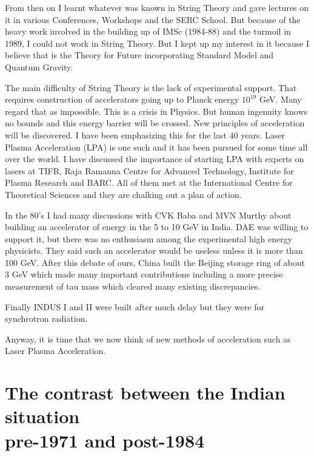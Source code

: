 From then on I learnt whatever was known in String Theory and gave 
lectures on it in various Conferences, Workshops and the SERC School. 
But because of the heavy work involved in the building up of IMSc 
(1984-88) and the turmoil in 1989, I could not work in String Theory. 
But I kept up my interest in it because I believe that is the Theory for 
Future incorporating Standard Model and Quantum Gravity.

The main difficulty of String Theory is the lack of experimental 
support. That requires construction of accelerators going up to Planck 
energy $10^{19}$ GeV. Many regard that as impo\-ssible. This is a crisis in 
Physics. But human ingenuity knows no bounds and this energy barrier 
will be crossed. New principles of acceleration will be discovered. I 
have been emphasizing this for the last 40 years. Laser Plasma 
Acceleration (LPA) is one such and it has been pursued for some time all 
over the world. I have discussed the importance of starting LPA with 
experts on lasers at TIFR, Raja Ramanna Centre for Advanced Technology, 
Institute for Plasma Research and BARC. All of them met at the 
International Centre for Theoretical Sciences and they are chalking out 
a plan of action.

In the 80's I had many discussions with CVK Baba and MVN Murthy about 
building an accelerator of energy in the 5 to 10 GeV in India. DAE was 
willing to support it, but there was no enthusiasm among the 
experimental high energy physicists. They said such an accelerator would 
be useless unless it is more than 100 GeV. After this debate of ours, 
China built the Beijing sto\-rage ring of about 3 GeV which made many 
important contributions including a more precise measurement of tau mass 
which cleared many existing discrepancies.

Finally INDUS I and II were built after much delay but they were for 
synchrotron radiation.

Anyway, it is time that we now think of new methods of acce\-leration such 
as Laser Plasma Acceleration.

\vspace{-.5cm}

\section*{The contrast between the Indian situation\\ pre-1971 and post-1984}

\vspace{-.2cm}

